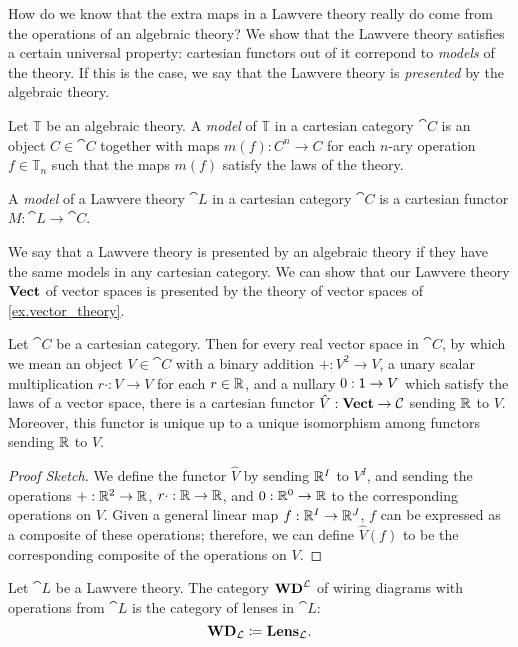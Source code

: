 \documentclass[DynamicalBook]{subfiles}
\begin{document}
How do we know that the extra maps in a Lawvere theory really do come from the
operations of an algebraic theory? We show that the Lawvere theory satisfies a
certain universal property: cartesian functors out of it correpond to
\emph{models} of the theory. If this is the case, we say that the Lawvere theory
is \emph{presented} by the algebraic theory.

\begin{informal}
Let $\mathbb{T}$ be an algebraic theory. A \emph{model} of $\mathbb{T}$ in a
cartesian category $\cat{C}$ is an object $C \in \cat{C}$ together with maps $m(f)
: C^n \to C$ for each $n$-ary operation $f \in \mathbb{T}_n$ such that the maps
$m(f)$ satisfy the laws of the theory.
\end{informal}

\begin{definition}
  A \emph{model} of a Lawvere theory $\cat{L}$ in a cartesian category $\cat{C}$ is a cartesian functor $M :
  \cat{L} \to \cat{C}$.
\end{definition}

We say that a Lawvere theory is presented by an algebraic theory if they have
the same models in any cartesian category.
We can show that our Lawvere theory $\textbf{Vect}$ of vector spaces is presented
by the theory of vector spaces of \cref{ex.vector_theory}.
\begin{proposition}
Let $\cat{C}$ be a cartesian category. Then for every real vector space in
$\cat{C}$, by which we mean an object $V \in \cat{C}$ with a binary addition
$+ : V^2 \to V$, a unary scalar multiplication $r\cdot : V \to V$ for each $r
\in \mathbb{R}$, and a nullary $0 : \mathsf{1} \to V$ which satisfy the laws of a vector
space, there is a cartesian functor $\hat{V} : \textbf{Vect} \to \mathcal{C}$ sending
$\mathbb{R}$ to $V$. Moreover, this functor is unique up to a unique isomorphism among
functors sending $\mathbb{R}$ to $V$.
\end{proposition}
\begin{proof}[Proof Sketch]
  We define the functor $\hat{V}$ by sending $\mathbb{R}^I$ to $V^I$, and sending the
  operations $+ : \mathbb{R}^2 \to \mathbb{R}$, $r \cdot : \mathbb{R} \to \mathbb{R}$, and $0 : \mathbb{R}^0 \to
  \mathbb{R}$ to the corresponding operations on $V$. Given a general linear map $f :
  \mathbb{R}^I \to \mathbb{R}^J$, $f$ can be expressed as a composite of these operations;
  therefore, we can define $\hat{V}(f)$ to be the corresponding composite of the
  operations on $V$. 
\end{proof}

\begin{definition}
Let $\cat{L}$ be a Lawvere theory. The category $\textbf{WD}^{\mathcal{L}}$ of wiring
diagrams with operations from $\cat{L}$ is the category of lenses in $\cat{L}$:
\[
\textbf{WD}_{\mathcal{L}} \coloneqq \textbf{Lens}_{ \mathcal{L} }.
\]
\end{definition}
\end{document}
